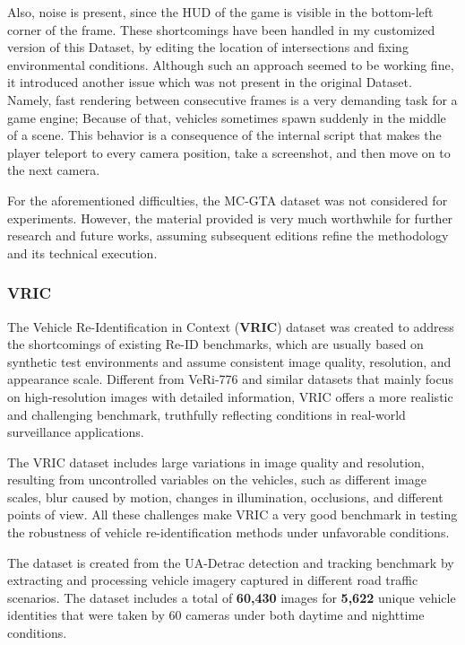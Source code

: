Also, noise is present, since the HUD of the game is visible in the bottom-left corner of the frame. These shortcomings have been handled in my customized version of this Dataset, by editing the location of intersections and fixing environmental conditions. Although such an approach seemed to be working fine, it introduced another issue which was not present in the original Dataset. Namely, fast rendering between consecutive frames is a very demanding task for a game engine; Because of that, vehicles sometimes spawn suddenly in the middle of a scene. This behavior is a consequence of the internal script that makes the player teleport to every camera position, take a screenshot, and then move on to the next camera.

For the aforementioned difficulties, the MC-GTA dataset was not considered for experiments. However, the material provided is very much worthwhile for further research and future works, assuming subsequent editions refine the methodology and its technical execution.

\subsubsection{VRIC}
The Vehicle Re-Identification in Context (\textbf{VRIC}) \cite{VRIC, VRIC2} dataset was created to address the shortcomings of existing Re-ID benchmarks, which are usually based on synthetic test environments and assume consistent image quality, resolution, and appearance scale. Different from VeRi-776 and similar datasets that mainly focus on high-resolution images with detailed information, VRIC offers a more realistic and challenging benchmark, truthfully reflecting conditions in real-world surveillance applications.

The VRIC dataset includes large variations in image quality and resolution, resulting from uncontrolled variables on the vehicles, such as different image scales, blur caused by motion, changes in illumination, occlusions, and different points of view. All these challenges make VRIC a very good benchmark in testing the robustness of vehicle re-identification methods under unfavorable conditions.

The dataset is created from the UA-Detrac \cite{DETRAC} detection and tracking benchmark by extracting and processing vehicle imagery captured in different road traffic scenarios. The dataset includes a total of \textbf{60,430} images for \textbf{5,622} unique vehicle identities that were taken by 60 cameras under both daytime and nighttime conditions.

